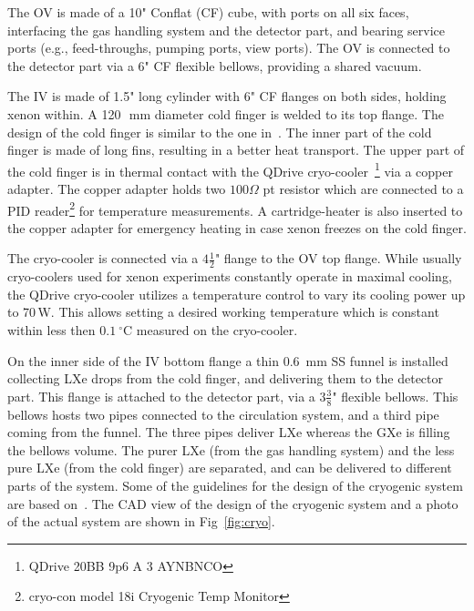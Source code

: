 The OV is made of a 10" Conflat (CF) cube, with ports on all six faces, interfacing the gas handling system and  the detector part, and bearing service ports (e.g., feed-throughs, pumping ports, 
view ports). The OV is connected to the detector part via a 6" CF flexible bellows, providing a shared vacuum.

The IV is made of 1.5" long cylinder with 6" CF flanges on both sides, holding xenon within. A 120~\,mm diameter cold finger is welded to its top flange. The design of the cold finger is similar to the one in~\cite{xe100_instr2012}. The inner part of the cold finger is made of long fins, resulting in a better heat transport.  The upper part of the cold finger is in thermal contact with the 
QDrive cryo-cooler~\footnote{QDrive 20BB 9p6 A 3 AYNBNCO} via a copper adapter. The copper adapter 
holds two $100\Omega$ pt resistor which are connected to a PID reader\footnote{cryo-con model 
18i Cryogenic Temp Monitor} for temperature measurements. A cartridge-heater 
is also inserted to the copper adapter for emergency heating in case xenon freezes on the 
cold finger. 

The cryo-cooler is connected via a $4\frac{1}{2}$" 
flange to the OV top flange. While usually cryo-coolers used for 
xenon experiments constantly operate in maximal cooling, the QDrive cryo-cooler utilizes a 
temperature control to vary its cooling power up to 70\,W. This allows setting a desired working temperature which is constant within less then $0.1~\mathrm{^{\circ}C}$ measured on the cryo-cooler.

On the inner side of the IV bottom flange a thin 0.6~mm SS funnel is installed 
collecting LXe drops from the cold finger, and delivering them to the  detector part. 
This flange is attached to the detector part, via a $3\frac{3}{8}$" flexible bellows. This 
bellows hosts two pipes connected to the circulation system, and a third pipe coming 
from the funnel. The three pipes deliver LXe whereas the GXe is filling the bellows volume. The purer LXe (from the gas handling system) and the less pure LXe (from the cold finger) are separated, and can be delivered to different parts of the system. Some of the guidelines for the design of 
the cryogenic system are based on~\cite{Giboni}. The CAD view of 
the design of the cryogenic system and a photo of the actual system are shown in Fig~\ref{fig:cryo}. 

